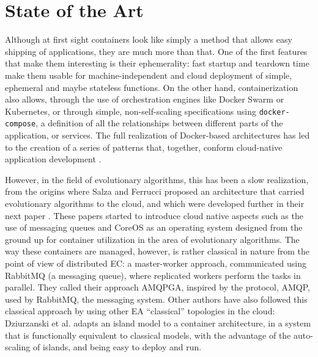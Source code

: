 \documentclass[review]{elsarticle}
\begin{document}
\section{State of the Art} 
\label{soa}

Although at first sight containers look like simply a method that
allows easy shipping of applications, they are much more than
that. One of the first features that make them interesting is their
ephemerality: fast startup and teardown time make them usable for
machine-independent and cloud deployment of simple, ephemeral and
maybe stateless functions. On the other hand, containerization also
allows, through the use of orchestration engines like Docker Swarm or
Kubernetes, or through simple, non-self-scaling specifications using
{\tt docker-compose}, a definition of all the relationships between
different parts of the application, or services. The full realization
of Docker-based architectures has led to the creation of a series of
patterns that, together, conform cloud-native application development
\cite{kratzke2017understanding}.

However, in the field of evolutionary algorithms, this has been a slow
realization, from the origins where Salza and Ferrucci
\cite{salza2016approach,salza2016develop} proposed an architecture that carried
evolutionary algorithms to the cloud, and which were developed further in their
next paper \cite{de2017parallel}. These papers started to introduce cloud native
aspects such as the use of messaging queues and CoreOS as an operating system
designed from the ground up for container utilization in the area of
evolutionary algorithms. The way these containers are managed, however, is
rather classical in nature from the point of view of distributed EC: a
master-worker approach, communicated using RabbitMQ (a messaging queue), where
replicated workers perform the tasks in parallel. They called their approach
AMQPGA, inspired by the protocol, AMQP, used by RabbitMQ, the messaging system.
Other authors have also followed this classical approach by using other EA
``classical'' topologies in the cloud: Dziurzanski et al.
\cite{dziurzanski2020scalable} adapts an island model to a container
architecture, in a system that is functionally equivalent to classical models,
with the advantage of the auto-scaling of islands, and being easy to deploy and
run.
\end{document}
